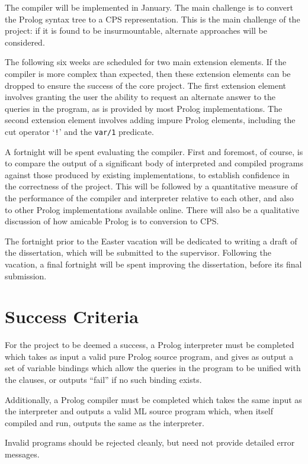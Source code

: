 \documentclass[12pt]{article}
\begin{document}
The compiler will be implemented in January. The main challenge is to convert the Prolog syntax tree to a CPS representation. This is the main challenge of the project: if it is found to be insurmountable, alternate approaches will be considered.

The following six weeks are scheduled for two main extension elements. If the compiler is more complex than expected, then these extension elements can be dropped to ensure the success of the core project. The first extension element involves granting the user the ability to request an alternate answer to the queries in the program, as is provided by most Prolog implementations. The second extension element involves adding impure Prolog elements, including the cut operator `\texttt{!}' and the \texttt{var/1} predicate.

A fortnight will be spent evaluating the compiler. First and foremost, of course, is to compare the output of a significant body of interpreted and compiled programs against those produced by existing implementations, to establish confidence in the correctness of the project. This will be followed by a quantitative measure of the performance of the compiler and interpreter relative to each other, and also to other Prolog implementations available online. There will also be a qualitative discussion of how amicable Prolog is to conversion to CPS.

The fortnight prior to the Easter vacation will be dedicated to writing a draft of the dissertation, which will be submitted to the supervisor. Following the vacation, a final fortnight will be spent improving the dissertation, before its final submission.

\section*{Success Criteria}

For the project to be deemed a success, a Prolog interpreter must be completed which takes as input a valid pure Prolog source program, and gives as output a set of variable bindings which allow the queries in the program to be unified with the clauses, or outputs ``fail'' if no such binding exists.

Additionally, a Prolog compiler must be completed which takes the same input as the interpreter and outputs a valid ML source program which, when itself compiled and run, outputs the same as the interpreter.

Invalid programs should be rejected cleanly, but need not provide detailed error messages.
\end{document}
